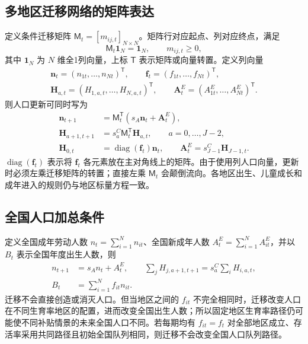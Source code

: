 \documentclass[UTF8,a4paper,zihao=-4,fontset=windows]{ctexart}
\numberwithin{equation}{section}
\begin{document}
\subsection{多地区迁移网络的矩阵表达}
\label{sec:migration-network}
定义条件迁移矩阵 $\mathsf M_t=[m_{ij,t}]_{N\times N}$。矩阵行对应起点、列对应终点，满足
\begin{equation}
  \mathsf M_t\mathbf 1_N=\mathbf 1_N,\qquad m_{ij,t}\geq0,
  \label{eq:migration-row-stochastic}
\end{equation}
其中 $\mathbf 1_N$ 为 $N$ 维全1列向量，上标 $\mathsf T$ 表示矩阵或向量转置。定义列向量
\begin{equation}
  \begin{gathered}
  \mathbf n_t=(n_{1t},\ldots,n_{Nt})^{\mathsf T},\qquad
  \mathbf f_t=(f_{1t},\ldots,f_{Nt})^{\mathsf T},\\
  \mathbf H_{a,t}=(H_{1,a,t},\ldots,H_{N,a,t})^{\mathsf T},\qquad
  \mathbf A^E_t=(A^E_{1t},\ldots,A^E_{Nt})^{\mathsf T}.
  \end{gathered}
  \label{eq:population-vectors}
\end{equation}
则人口更新可同时写为
\begin{align}
  \mathbf n_{t+1}
    &=\mathsf M_t^{\mathsf T}
       (s_A\mathbf n_t+\mathbf A^E_t),
       \label{eq:adult-network-transition}\\
  \mathbf H_{a+1,t+1}
    &=s^C_a\mathsf M_t^{\mathsf T}\mathbf H_{a,t},
       \qquad a=0,\ldots,J-2,
       \label{eq:child-network-transition}\\
  \mathbf H_{0,t}
    &=\operatorname{diag}(\mathbf f_t)\mathbf n_t,\qquad
  \mathbf A^E_t=s^C_{J-1}\mathbf H_{J-1,t}.
       \label{eq:birth-entry-network}
\end{align}
$\operatorname{diag}(\mathbf f_t)$ 表示将 $\mathbf f_t$ 各元素放在主对角线上的矩阵。由于使用列人口向量，更新时必须左乘迁移矩阵的转置；直接左乘 $\mathsf M_t$ 会颠倒流向。各地区出生、儿童成长和成年进入的规则仍与地区标量方程一致。

\subsection{全国人口加总条件}
定义全国成年劳动人数 $n_t=\sum_{i=1}^N n_{it}$、全国新成年人数 $A^E_t=\sum_{i=1}^NA^E_{it}$，并以 $B_t$ 表示全国年度出生人数，则
\begin{align}
  n_{t+1}&=s_An_t+A^E_t,\qquad
  \sum_jH_{j,a+1,t+1}=s^C_a\sum_iH_{i,a,t},\\
  B_t&=\sum_{i=1}^N f_{it}n_{it}.
  \label{eq:national-demography}
\end{align}
迁移不会直接创造或消灭人口。但当地区之间的 $f_{it}$ 不完全相同时，迁移改变人口在不同生育率地区的配置，进而改变全国出生人数；所以固定地区生育率路径仍可能使不同补贴情景的未来全国人口不同。若每期均有 $f_{it}=f_t$ 对全部地区成立、存活率采用共同路径且初始全国队列相同，则迁移不会改变全国人口队列路径。
\end{document}
